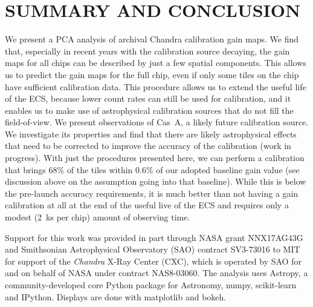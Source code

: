 \documentclass[]{spie}  %
\begin{document}
\section{SUMMARY AND CONCLUSION}
We present a PCA analysis of archival Chandra calibration gain maps. We find that, especially in recent years with the calibration source decaying, the gain maps for all chips can be described by just a few spatial components. This allows us to predict the gain maps for the full chip, even if only some tiles on the chip have sufficient calibration data. This procedure allows us to extend the useful life of the ECS, because lower count rates can still be used for calibration, and it enables us to make use of astrophysical calibration sources that do not fill the field-of-view. We present observations of Cas~A, a likely future calibration source. We investigate its properties and find that there are likely astrophysical effects that need to be corrected to improve the accuracy of the calibration (work in progress). With just the procedures presented here, we can perform a calibration that brings 68\% of the tiles within 0.6\% of our adopted baseline gain value (see discussion above on the assumption going into that baseline). While this is below the pre-launch accuracy requirements, it is much better than not having a gain calibration at all at the end of the useful live of the ECS and requires only a modest (2~ks per chip) amount of observing time.

\acknowledgments
Support
for this work was provided in part through NASA grant NNX17AG43G and
Smithsonian Astrophysical Observatory (SAO) contract SV3-73016 to MIT
for support of the {\em Chandra} X-Ray Center (CXC), which is operated
by SAO for and on behalf of NASA under contract NAS8-03060.
The
analysis uses Astropy, a community-developed core Python
package for Astronomy\cite{astropy1,astropy2}, numpy\cite{numpy}, scikit-learn\cite{scikit-learn} and
IPython\cite{IPython}. Displays are done with
matplotlib\cite{matplotlib} and bokeh\cite{bokeh}.

\end{document}
